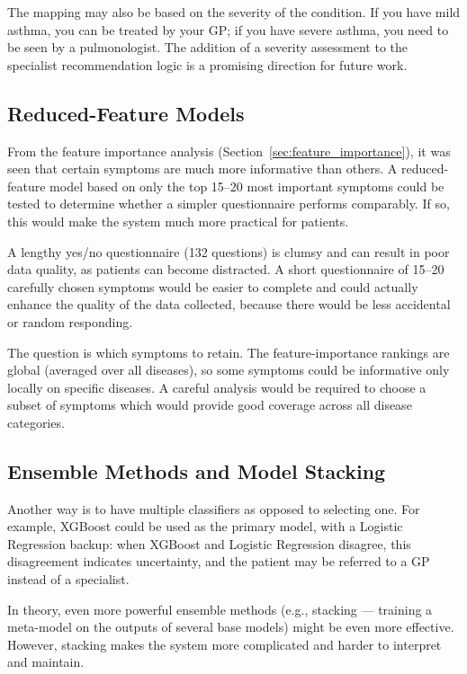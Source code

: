 The mapping may also be based on the severity of the condition. If you have mild asthma, you can be treated by your GP; if you have severe asthma, you need to be seen by a pulmonologist. The addition of a severity assessment to the specialist recommendation logic is a promising direction for future work.

\subsection{Reduced-Feature Models}

From the feature importance analysis (Section~\ref{sec:feature_importance}), it was seen that certain symptoms are much more informative than others. A reduced-feature model based on only the top 15--20 most important symptoms could be tested to determine whether a simpler questionnaire performs comparably. If so, this would make the system much more practical for patients.

A lengthy yes/no questionnaire (132 questions) is clumsy and can result in poor data quality, as patients can become distracted. A short questionnaire of 15--20 carefully chosen symptoms would be easier to complete and could actually enhance the quality of the data collected, because there would be less accidental or random responding.

The question is which symptoms to retain. The feature-importance rankings are global (averaged over all diseases), so some symptoms could be informative only locally on specific diseases. A careful analysis would be required to choose a subset of symptoms which would provide good coverage across all disease categories.

\subsection{Ensemble Methods and Model Stacking}

Another way is to have multiple classifiers as opposed to selecting one. For example, XGBoost could be used as the primary model, with a Logistic Regression backup: when XGBoost and Logistic Regression disagree, this disagreement indicates uncertainty, and the patient may be referred to a GP instead of a specialist.

In theory, even more powerful ensemble methods (e.g., stacking --- training a meta-model on the outputs of several base models) might be even more effective. However, stacking makes the system more complicated and harder to interpret and maintain.

